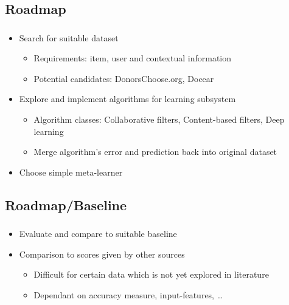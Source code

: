 \documentclass[aspectratio=169]{beamer}
\begin{document}
\subsection{Roadmap}
\begin{frame}
	\frametitle{\insertsection}
	\framesubtitle{\insertsubsection}

	\begin{itemize}
		\item Search for suitable dataset
		\begin{itemize}
			\item Requirements: item, user and contextual information
			\item Potential candidates: DonorsChoose.org, Docear
		\end{itemize}
		\item Explore and implement algorithms for learning subsystem
		\begin{itemize}
			\item Algorithm classes: Collaborative filters, Content-based filters, Deep learning
			\item Merge algorithm's error and prediction back into original dataset
		\end{itemize}
		\item Choose simple meta-learner
	\end{itemize}
\end{frame}

\subsection{Roadmap/Baseline}
\begin{frame}
	\frametitle{\insertsection}
	\framesubtitle{\insertsubsection}

	\begin{itemize}
		\item Evaluate and compare to suitable baseline
		\item Comparison to scores given by other sources
		\begin{itemize}
			\item Difficult for certain data which is not yet explored in literature
			\item Dependant on accuracy measure, input-features, \ldots
		\end{itemize}
	\end{itemize}
\end{frame}
\end{document}
